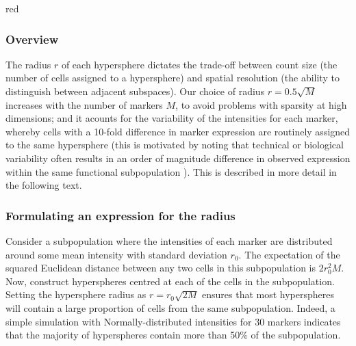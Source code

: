 \documentclass{article}
\begin{document}
\begin{color}{red}
\subsubsection{Overview}
The radius $r$ of each hypersphere dictates the trade-off between count size (the number of cells assigned to a hypersphere) and spatial resolution (the ability to distinguish between adjacent subspaces).
Our choice of radius $r=0.5\sqrt{M}$ increases with the number of markers $M$, to avoid problems with sparsity at high dimensions; and it acounts for the variability of the intensities for each marker, whereby cells with a 10-fold difference in marker expression are routinely assigned to the same hypersphere (this is motivated by noting that technical or biological variability often results in an order of magnitude difference in observed expression within the same functional subpopulation \cite{ornatsky2008study,zunder2015continuous,zunder2015palladium}).
This is described in more detail in the following text.
\end{color}

\subsubsection{Formulating an expression for the radius}
Consider a subpopulation where the intensities of each marker are distributed around some mean intensity with standard deviation $r_0$.
The expectation of the squared Euclidean distance between any two cells in this subpopulation is $2r_0^2M$.
Now, construct hyperspheres centred at each of the cells in the subpopulation.
Setting the hypersphere radius as $r=r_0\sqrt{2M}$ ensures that most hyperspheres will contain a large proportion of cells from the same subpopulation.
Indeed, a simple simulation with Normally-distributed intensities for 30 markers indicates that the majority of hyperspheres contain more than 50\% of the subpopulation.

\end{document}
